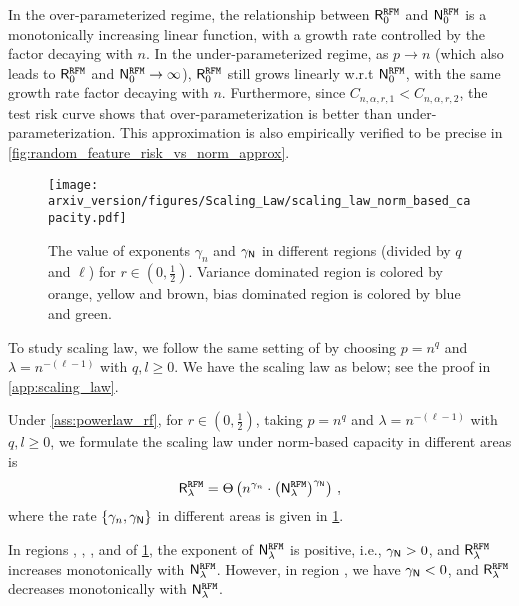 In the over-parameterized regime, the relationship between \(\mathsf R_0^{\tt RFM}\) and \(\mathsf N_0^{\tt RFM}\) is a monotonically increasing linear function, with a growth rate controlled by the factor decaying with $n$.
In the under-parameterized regime, as \(p \to n\) (which also leads to \(\mathsf R_0^{\tt RFM}\) and \(\mathsf N_0^{\tt RFM} \to \infty\)), \(\mathsf R_0^{\tt RFM}\) still grows linearly w.r.t \(\mathsf N_0^{\tt RFM}\), with the same growth rate factor decaying with $n$. Furthermore, since \(C_{n,\alpha,r,1} < C_{n,\alpha,r,2}\), the test risk curve shows that over-parameterization is better than under-parameterization.
This approximation is also empirically verified to be precise in \cref{fig:random_feature_risk_vs_norm_approx}.


\begin{figure}[t]
    \centering
    \texttt{[image: arxiv\_version/figures/Scaling\_Law/scaling\_law\_norm\_based\_capacity.pdf]} 
    \caption{The value of exponents $\gamma_n$ and $\gamma_\mathsf N$ in different regions (divided by $q$ and $\ell$) for $r \in (0, \frac{1}{2})$. Variance dominated region is colored by {\color{regionorange}orange}, {\color{regionyellow}yellow} and {\color{regionbrown}brown}, bias dominated region is colored by {\color{regionblue}blue} and {\color{regiongreen}green}.} 
    \label{fig:scaling_law_norm_based_capacity} \vspace{-0.35cm}
\end{figure}


To study scaling law, we follow the same setting of \citet{defilippis2024dimension} by choosing $p = n^q$ and $\lambda = n^{-(\ell-1)}$ with $q,l \geq 0$. We have the scaling law as below; see the proof in \cref{app:scaling_law}.
\begin{proposition}\label{prop:scaling_law_norm_based_capacity}
Under \cref{ass:powerlaw_rf}, for $r \in (0, \frac{1}{2})$, taking $p = n^q$ and $\lambda = n^{-(\ell-1)}$ with $q,l \geq 0$, we formulate the scaling law under norm-based capacity in different areas is 
\begin{equation*}
    \mathsf R_\lambda^{\tt RFM} = \Theta\left(n^{\gamma_n} \cdot \left(\mathsf N_\lambda^{\tt RFM}\right)^{\gamma_{\mathsf N}}\right)\,, 
\end{equation*}    
where the rate $\{ \gamma_n, \gamma_{\mathsf N} \}$ in different areas is given in \cref{fig:scaling_law_norm_based_capacity}.
\end{proposition}

In regions , , , and  of \cref{fig:scaling_law_norm_based_capacity}, the exponent of \(\mathsf N_\lambda^{\tt RFM}\) is positive, i.e., $\gamma_{\mathsf N} >0$, and  \(\mathsf R_\lambda^{\tt RFM}\) increases monotonically with  \(\mathsf N_\lambda^{\tt RFM}\). However, in region , we have $\gamma_{\mathsf N} <0$, and \(\mathsf R_\lambda^{\tt RFM}\) decreases monotonically with \(\mathsf N_\lambda^{\tt RFM}\).\\